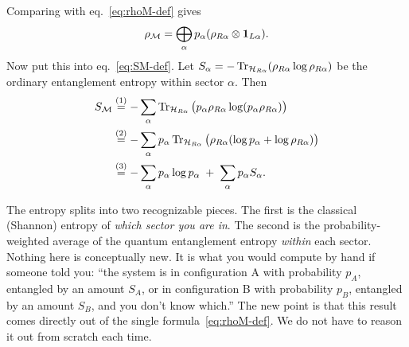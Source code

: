 Comparing with eq.~\eqref{eq:rhoM-def} gives
\[
\rho_{\mathcal{M}}=\bigoplus_\alpha p_\alpha(\rho_{R\alpha}\otimes\mathbf{1}_{L\alpha}) .
\]
Now put this into eq.~\eqref{eq:SM-def}. Let $S_\alpha=-\operatorname{Tr}_{\mathcal{H}_{R\alpha}}(\rho_{R\alpha}\log\rho_{R\alpha})$ be
the ordinary entanglement entropy within sector $\alpha$. Then
\begin{align}
S_{\mathcal{M}}
&\overset{(1)}{=} -\sum_\alpha\operatorname{Tr}_{\mathcal{H}_{R\alpha}}\big(p_\alpha\rho_{R\alpha}\log(p_\alpha\rho_{R\alpha})\big) \notag\\
&\overset{(2)}{=} -\sum_\alpha p_\alpha\operatorname{Tr}_{\mathcal{H}_{R\alpha}}\big(\rho_{R\alpha}(\log p_\alpha+\log\rho_{R\alpha})\big)
\notag\\
&\overset{(3)}{=} -\sum_\alpha p_\alpha\log p_\alpha \;+\; \sum_\alpha p_\alpha S_\alpha .
\label{eq:SM-center}
\end{align}
\quad
{}\quad
{}

The entropy splits into two recognizable pieces. The first is the classical (Shannon) entropy of \emph{which
sector you are in}. The second is the probability-weighted average of the quantum entanglement entropy
\emph{within} each sector. Nothing here is conceptually new. It is what you would compute by hand if someone
told you: ``the system is in configuration A with probability $p_A$, entangled by an amount $S_A$, or in
configuration B with probability $p_B$, entangled by an amount $S_B$, and you don't know which.'' The new point
is that this result comes directly out of the single formula~\eqref{eq:rhoM-def}. We do not have to reason it
out from scratch each time.

